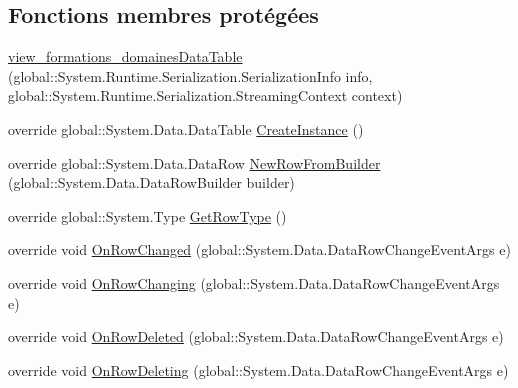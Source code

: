 \subsection*{Fonctions membres protégées}
\begin{DoxyCompactItemize}
\item 
\hyperlink{classforma_1_1formadb_data_set_1_1view__formations__domaines_data_table_ab857e6db8a303751f2ee002732d250b7}{view\+\_\+formations\+\_\+domaines\+Data\+Table} (global\+::\+System.\+Runtime.\+Serialization.\+Serialization\+Info info, global\+::\+System.\+Runtime.\+Serialization.\+Streaming\+Context context)
\item 
override global\+::\+System.\+Data.\+Data\+Table \hyperlink{classforma_1_1formadb_data_set_1_1view__formations__domaines_data_table_afaa874169962b0b34de459d7cf00dd86}{Create\+Instance} ()
\item 
override global\+::\+System.\+Data.\+Data\+Row \hyperlink{classforma_1_1formadb_data_set_1_1view__formations__domaines_data_table_a427d691d13dc6d1836d0baecff4f92e1}{New\+Row\+From\+Builder} (global\+::\+System.\+Data.\+Data\+Row\+Builder builder)
\item 
override global\+::\+System.\+Type \hyperlink{classforma_1_1formadb_data_set_1_1view__formations__domaines_data_table_a20eb75c44999efab4859bd995ffdcefa}{Get\+Row\+Type} ()
\item 
override void \hyperlink{classforma_1_1formadb_data_set_1_1view__formations__domaines_data_table_a0a3e877946a113740ece0a0a7a39f2ed}{On\+Row\+Changed} (global\+::\+System.\+Data.\+Data\+Row\+Change\+Event\+Args e)
\item 
override void \hyperlink{classforma_1_1formadb_data_set_1_1view__formations__domaines_data_table_a09b2a27718feeaf5f6974f452f80cdc7}{On\+Row\+Changing} (global\+::\+System.\+Data.\+Data\+Row\+Change\+Event\+Args e)
\item 
override void \hyperlink{classforma_1_1formadb_data_set_1_1view__formations__domaines_data_table_ab207465de36c59c03ad615d83794add5}{On\+Row\+Deleted} (global\+::\+System.\+Data.\+Data\+Row\+Change\+Event\+Args e)
\item 
override void \hyperlink{classforma_1_1formadb_data_set_1_1view__formations__domaines_data_table_ad31097c83c77680d36919a79807b1e17}{On\+Row\+Deleting} (global\+::\+System.\+Data.\+Data\+Row\+Change\+Event\+Args e)
\end{DoxyCompactItemize}
